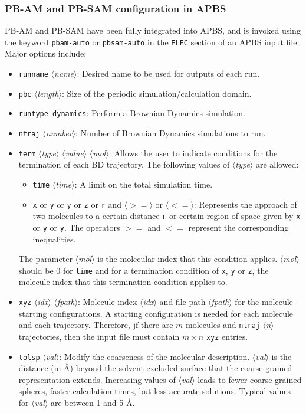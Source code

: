 \documentclass[12pt,titlepage]{article}
\newcommand{\keyword}[1]{\texttt{#1}}
\newcommand{\param}[1]{$\langle$\textit{#1}$\rangle$}
\begin{document}
\subsubsection{PB-AM and PB-SAM configuration in APBS}
PB-AM and PB-SAM have been fully integrated into APBS, and is invoked using the keyword \keyword{pbam-auto} or \keyword{pbsam-auto} in the \keyword{ELEC} section of an APBS input file.
Major options include:
\begin{itemize}
	\item \keyword{runname} \param{name}: Desired name to be used for outputs of each run.
	\item \keyword{pbc} \param{length}:  Size of the periodic simulation/calculation domain.
	\item \keyword{runtype dynamics}:  Perform a Brownian Dynamics simulation.
	\item \keyword{ntraj} \param{number}:  Number of Brownian Dynamics simulations to run. 
	\item \keyword{term} \param{type} \param{value} \param{mol}:  Allows the user to indicate conditions for the termination of each BD trajectory.
	The following values of \param{type} are allowed:
	\begin{itemize}
		\item \keyword{time} \param{time}: A limit on the total simulation time.
		\item \keyword{x} or \keyword{y} or \keyword{y} or \keyword{z} or \keyword{r} and \param{$>=$} or \param{$<=$}: Represents the approach of two molecules to a certain distance \keyword{r} or certain region of space given by \keyword{x} or \keyword{y} or \keyword{y}.
		The operators $>=$ and $<=$ represent the corresponding inequalities.
	\end{itemize}
	The parameter \param{mol} is the molecular index that this condition applies.  \param{mol} should be 0 for \keyword{time} and for a termination condition of \keyword{x}, \keyword{y} or \keyword{z}, the molecule index that this termination condition applies to.
	\item \keyword{xyz} \param{idx} \param{fpath}:  Molecule index \param{idx} and file path \param{fpath} for the molecule starting configurations. 
	A starting configuration is needed for each molecule and each trajectory.
	Therefore, jf there are $m$ molecules and \keyword{ntraj} \param{n} trajectories, then the input file must contain $m \times n$ \keyword{xyz} entries.
	\item \keyword{tolsp} \param{val}: Modify the coarseness of the molecular description.
	\param{val} is the distance (in \AA) beyond the solvent-excluded surface that the coarse-grained representation extends.
	Increasing values of \param{val} leads to fewer coarse-grained spheres, faster calculation times, but less accurate solutions.
	Typical values for \param{val} are between 1 and 5 \AA.
\end{itemize}
\end{document}
